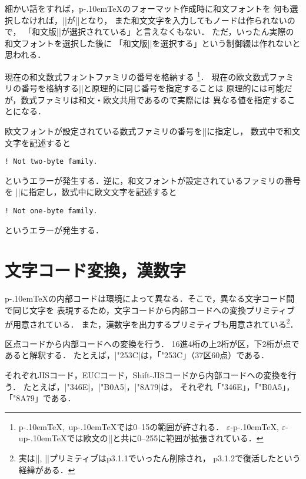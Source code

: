 \documentclass[a4paper,11pt,nomag]{jsarticle}
\def\epTeX{$\varepsilon$-\pTeX}\def\eTeX{$\varepsilon$-\TeX}
\def\eupTeX{$\varepsilon$-\upTeX}\def\upTeX{u\pTeX}
\def\pTeX{p\kern-.10em\TeX}
\begin{document}
\begin{dangerous}
  細かい話をすれば，\pTeX のフォーマット作成時に和文フォントを
  何も選択しなければ，|\fontname\jfont|が|\nullfont|となり，
  また和文文字を入力してもノードは作られないので，
  「和文版|\nullfont|が選択されている」と言えなくもない．
  ただ，いったん実際の和文フォントを選択した後に
  「和文版|\nullfont|を選択する」という制御綴は作れないと思われる．
\end{dangerous}

\begin{cslist}
\csitem[\.{jfam}=<number>]
  現在の和文数式フォントファミリの番号を格納する
  \footnote{\pTeX,~\upTeX では0--15の範囲が許される．
  \epTeX, \eupTeX では欧文の|\fam|と共に0--255に範囲が拡張されている．}．
  現在の欧文数式ファミリの番号を格納する|\fam|と原理的に同じ番号を指定することは
  原理的には可能だが，数式ファミリは和文・欧文共用であるので実際には
  異なる値を指定することになる．

  欧文フォントが設定されている数式ファミリの番号を|\jfam|に指定し，
  数式中で和文文字を記述すると
\begin{verbatim}
! Not two-byte family.
\end{verbatim}
  というエラーが発生する．逆に，和文フォントが設定されているファミリの番号を
  |\fam|に指定し，数式中に欧文文字を記述すると
\begin{verbatim}
! Not one-byte family.
\end{verbatim}
  というエラーが発生する．
\end{cslist}

\section{文字コード変換，漢数字}

\pTeX の内部コードは環境によって異なる．そこで，異なる文字コード間で同じ文字を
表現するため，文字コードから内部コードへの変換プリミティブが用意されている．
また，漢数字を出力するプリミティブも用意されている\footnote{%
実は|\kansuji|, |\kansujichar|プリミティブはp3.1.1でいったん削除され，
p3.1.2で復活したという経緯がある．}．

\begin{cslist}
  区点コードから内部コードへの変換を行う．
  16進4桁の上2桁が区，下2桁が点であると解釈する．
  たとえば，|\char\kuten"253C|は，「\char\kuten"253C」（37区60点）である．

  それぞれJISコード，EUCコード，Shift-JISコードから内部コードへの変換を行う．
  たとえば，|\char\jis"346E|，|\char\euc"B0A5|，|\char\sjis"8A79|は，
  それぞれ「\char\jis"346E」，「\char\euc"B0A5」，「\char\sjis"8A79」である．
\end{cslist}
\end{document}
